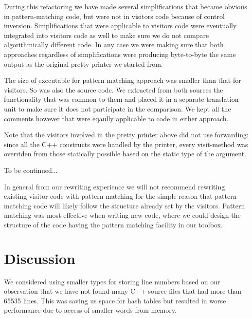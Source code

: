 \documentclass[preprint]{sigplanconf}
\begin{document}
During this refactoring we have made several simplifications that became obvious 
in pattern-matching code, but were not in visitors code because of control 
inversion. Simplifications that were applicable to visitors code were eventually 
integrated into visitors code as well to make sure we do not compare 
algorithmically different code. In any case we were making sure that both 
approaches regardless of simplifications were producing byte-to-byte the same 
output as the original pretty printer we started from.

The size of executable for pattern matching approach was smaller than that for 
visitors. So was also the source code. We extracted from both sources the 
functionality that was common to them and placed it in a separate translation 
unit to make sure it does not participate in the comparison. We kept all the 
comments however that were eqaully applicable to code in either approach.

Note that the visitors involved in the pretty printer above did not use 
forwarding: since all the C++ constructs were handled by the printer, every 
visit-method was overriden from those statically possible based on the static 
type of the argument.


To be continued...

In general from our rewriting experience we will not recommend rewriting 
existing visitor code with pattern matching for the simple reason that pattern 
matching code will likely follow the structure already set by the visitors. 
Pattern matching was most effective when writing new code, where we could design 
the structure of the code having the pattern matching facility in our toolbox.

\section{Discussion} %
\label{sec:dsc}

We considered using smaller types for storing line numbers based on our 
observation that we have not found many C++ source files that had more than 65535 
lines. This was saving us space for hash tables but resulted in worse 
performance due to access of smaller words from memory.
\end{document}
